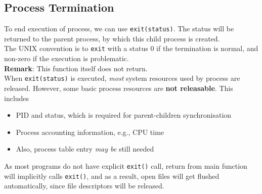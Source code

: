 \documentclass[11pt]{article}
\theoremstyle{definition}
\begin{document}
\subsection{Process Termination}
To end execution of process, we can use \texttt{exit(status)}. The status will be returned to the parent process, by which this child process is created.\\
The UNIX convention is to \texttt{exit} with a status $0$ if the termination is normal, and non-zero if the execution is problematic.\\
\textbf{Remark}: This function itself does not return.\\
When \texttt{exit(status)} is executed, \textit{most} system resources used by process are released. However, some basic process resources are \textbf{not releasable}. This includes
\begin{itemize}[itemsep=0pt]
\item PID and status, which is required for parent-children synchronisation
\item Process accounting information, e.g., CPU time\
\item Also, process table entry \textit{may be} still needed
\end{itemize}   
As most programs do not have explicit \texttt{exit()} call, return from main function will implicitly calls \texttt{exit()}, and as a result, open files will get flushed automatically, since file descriptors will be released.
\end{document}
